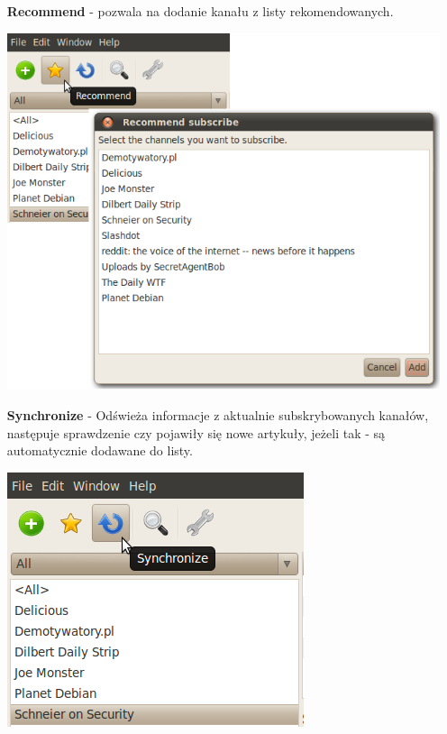 \documentclass[a4paper,11pt]{report}
\begin{document}
\begin{itemize}
	\newpage
	\item[\textbf{Recommend}] - pozwala na dodanie kanału z listy 
				    rekomendowanych.
	\begin{center}
		\includegraphics[scale=0.5]{./img/menu_recom.png}
	\end{center}

	\newpage
	\item[\textbf{Synchronize}] - Odświeża informacje z aktualnie 
		subskrybowanych kanałów, następuje sprawdzenie czy pojawiły się
		nowe artykuły, jeżeli tak - są automatycznie dodawane do listy.
	\begin{center}
		\includegraphics[scale=0.5]{./img/menu_sync.png}
	\end{center}


\end{itemize}
\end{document}
